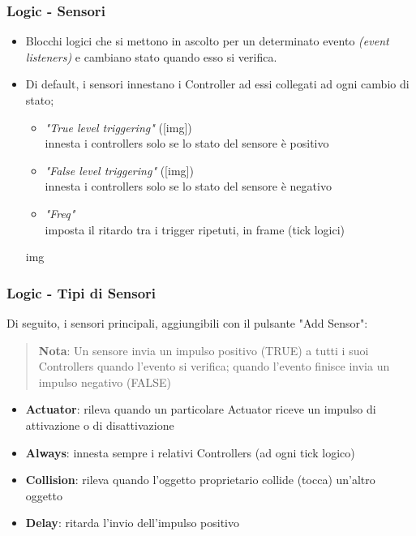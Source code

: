 \documentclass{beamer}
\begin{document}
		\begin{frame}		%
			\frametitle{Logic - Sensori}
			\begin{itemize}
				\item Blocchi logici che \textcolor{BlenderOrange}{si mettono in ascolto} per un determinato evento \textit{(event listeners)} e \textcolor{BlenderOrange}{cambiano stato }quando esso si verifica.
				\item Di default, i sensori \textcolor{BlenderOrange}{innestano i Controller} ad essi collegati ad ogni cambio di stato;
				\begin{itemize}
					\item \textit{"True level triggering"} ([img]) \\ {\footnotesize\hspace{1em} innesta i controllers solo se lo stato del sensore è positivo}
					\item \textit{"False level triggering"} ([img]) \\ {\footnotesize\hspace{1em}innesta i controllers solo se lo stato del sensore è negativo}
					\item \textit{"Freq"} \\ {\footnotesize\hspace{1em}imposta il ritardo tra i trigger ripetuti, in frame (tick logici)}
				\end{itemize}
				\item [img]
			\end{itemize}
		\end{frame}		
		\begin{frame}
			\frametitle{Logic - Tipi di Sensori}
			Di seguito, i sensori principali, aggiungibili con il pulsante "Add Sensor":\\
			\begin{quote}
			\textcolor{BlenderOrange}{\textbf{Nota}: Un sensore invia un impulso positivo (TRUE) a tutti i suoi Controllers quando l'evento si verifica; quando l'evento finisce invia un impulso negativo (FALSE)}
			\end{quote}
						
			\begin{itemize}
				\item \textbf{Actuator}: rileva quando un particolare Actuator riceve un impulso di attivazione o di disattivazione
				\item \textbf{Always}: innesta sempre i relativi Controllers (ad ogni tick logico)
				\item \textbf{Collision}: rileva quando l'oggetto proprietario collide (tocca) un'altro oggetto
				\item \textbf{Delay}: ritarda l'invio dell'impulso positivo
			\end{itemize}
		\end{frame}	
\end{document}
